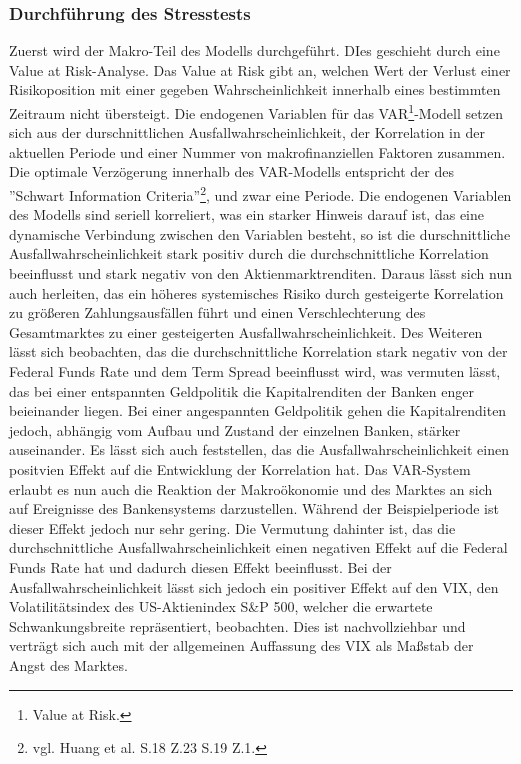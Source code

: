 \documentclass[a4paper,12pt]{scrartcl}
\begin{document}
\subsubsection{Durchführung des Stresstests}
Zuerst wird der Makro-Teil des Modells durchgeführt. DIes geschieht durch eine Value at Risk-Analyse. Das Value at Risk gibt an, welchen Wert der Verlust einer Risikoposition mit einer gegeben Wahrscheinlichkeit innerhalb eines bestimmten Zeitraum nicht übersteigt. 
Die endogenen Variablen für das VAR\footnote{Value at Risk.}-Modell setzen sich aus der durschnittlichen Ausfallwahrscheinlichkeit, der Korrelation in der aktuellen Periode und einer Nummer von makrofinanziellen Faktoren zusammen. Die optimale Verzögerung innerhalb des VAR-Modells entspricht der des ''Schwart Information Criteria''\footnote{vgl. Huang et al. S.18 Z.23 S.19 Z.1.}, und zwar eine Periode. Die endogenen Variablen des Modells sind seriell korreliert, was ein starker Hinweis darauf ist, das eine dynamische Verbindung zwischen den Variablen besteht, so ist die durschnittliche Ausfallwahrscheinlichkeit stark positiv durch die durchschnittliche Korrelation beeinflusst und stark negativ von den Aktienmarktrenditen.
Daraus lässt sich nun auch herleiten, das ein höheres systemisches Risiko durch gesteigerte Korrelation zu größeren Zahlungsausfällen führt und einen Verschlechterung des Gesamtmarktes zu einer gesteigerten Ausfallwahrscheinlichkeit.
Des Weiteren lässt sich beobachten, das die durchschnittliche Korrelation stark negativ von der Federal Funds Rate und dem Term Spread beeinflusst wird, was vermuten lässt, das bei einer entspannten Geldpolitik die Kapitalrenditen der Banken enger beieinander liegen. Bei einer angespannten Geldpolitik gehen die Kapitalrenditen jedoch, abhängig vom Aufbau und Zustand der einzelnen Banken, stärker auseinander.  
Es lässt sich auch feststellen, das die Ausfallwahrscheinlichkeit einen positvien Effekt auf die Entwicklung der Korrelation hat.
Das VAR-System erlaubt es nun auch die Reaktion der Makroökonomie und des Marktes an sich auf Ereignisse des Bankensystems darzustellen. Während der Beispielperiode ist dieser Effekt jedoch nur sehr gering. Die Vermutung dahinter ist, das die durchschnittliche Ausfallwahrscheinlichkeit einen negativen Effekt auf die Federal Funds Rate hat und dadurch diesen Effekt beeinflusst.
Bei der Ausfallwahrscheinlichkeit lässt sich jedoch ein positiver Effekt auf den VIX, den Volatilitätsindex des US-Aktienindex S\&P 500, welcher die erwartete Schwankungsbreite repräsentiert, beobachten. Dies ist nachvollziehbar und verträgt sich auch mit der allgemeinen Auffassung des VIX als Maßstab der Angst des Marktes. 
\end{document}
